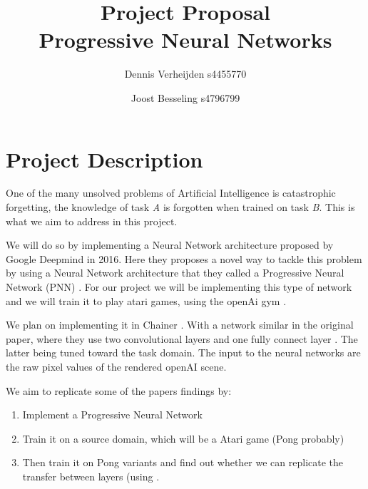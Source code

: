 \documentclass{article}
\title{Project Proposal \\ Progressive Neural Networks}
\author{Dennis Verheijden s4455770 \and Joost Besseling s4796799}
\begin{document}
\maketitle
\section*{Project Description}
One of the many unsolved problems of Artificial Intelligence is catastrophic forgetting, the knowledge of task \textit{A} is forgotten when trained on task \textit{B}. This is what we aim to address in this project.

We will do so by implementing a Neural Network architecture proposed by Google Deepmind in 2016. Here they proposes a novel way to tackle this problem by using a Neural Network architecture that they called a Progressive Neural Network (PNN) \cite{rusu2016progressive}. For our project we will be implementing this type of network and we will train it to play atari games, using the openAi gym \cite{1606.01540}.

We plan on implementing it in Chainer \cite{chainer_learningsys2015}. With a network similar in the original paper, where they use two convolutional layers and one fully connect layer \cite{1606.01540}. The latter being tuned toward the task domain. The input to the neural networks are the raw pixel values of the rendered openAI scene.

We aim to replicate some of the papers findings by:
\begin{enumerate}[1.]
\item Implement a Progressive Neural Network
\item Train it on a source domain, which will be a Atari game (Pong probably)
\item Then train it on Pong variants and find out whether we can replicate the transfer between layers (using .
\end{enumerate}



\end{document}
